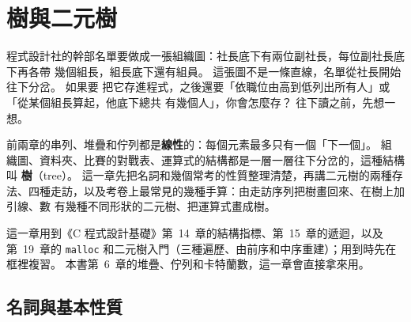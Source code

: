 \chapter{樹與二元樹}
\label{ch:trees}

\newcommand{\btmaintree}{%
\node[btn] (A) {A}
    child {node[btn] (B) {B}
        child {node[btn] (D) {D}}
        child {node[btn] (E) {E}
            child {node[btn] (G) {G}}
            child[missing]}}
    child {node[btn] (C) {C}
        child[missing]
        child {node[btn] (F) {F}
            child {node[btn] (H) {H}
                child[missing]
                child {node[btn] (J) {J}}}
            child {node[btn] (I) {I}}}};}

程式設計社的幹部名單要做成一張組織圖：社長底下有兩位副社長，每位副社長底下再各帶
幾個組長，組長底下還有組員。 這張圖不是一條直線，名單從社長開始往下分岔。 如果要
把它存進程式，之後還要「依職位由高到低列出所有人」或「從某個組長算起，他底下總共
有幾個人」，你會怎麼存？ 往下讀之前，先想一想。

前兩章的串列、堆疊和佇列都是\textbf{線性}的：每個元素最多只有一個「下一個」。 組
織圖、資料夾、比賽的對戰表、運算式的結構都是一層一層往下分岔的，這種結構叫
\textbf{樹}（tree）。 這一章先把名詞和幾個常考的性質整理清楚，再講二元樹的兩種存
法、四種走訪，以及考卷上最常見的幾種手算：由走訪序列把樹畫回來、在樹上加引線、數
有幾種不同形狀的二元樹、把運算式畫成樹。

這一章用到《C 程式設計基礎》第~14~章的結構指標、第~15~章的遞迴，以及第~19~章的
\texttt{malloc} 和二元樹入門（三種遍歷、由前序和中序重建）；用到時先在框裡複習。
本書第~6~章的堆疊、佇列和卡特蘭數，這一章會直接拿來用。

\section{名詞與基本性質}
\label{sec:bt-terms}

